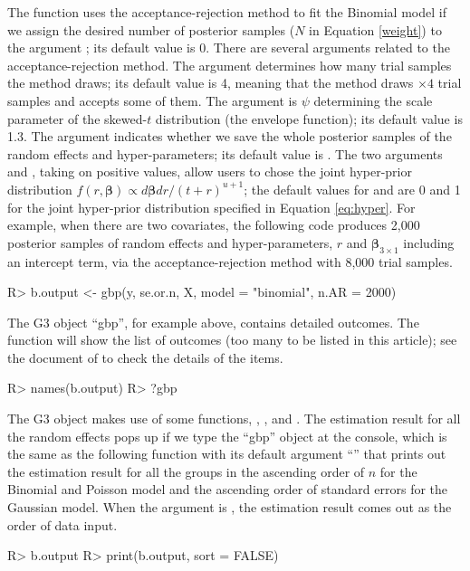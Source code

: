 \documentclass[article]{jss}
\begin{document}
The function  uses the acceptance-rejection method to fit the Binomial model if we assign the desired number of posterior samples ($N$ in Equation \ref{weight}) to the argument ; its default value is 0. There are several arguments related to the acceptance-rejection method. The argument  determines how many trial samples the method draws; its default value is 4, meaning that the method draws  $\times4$ trial samples and accepts some of them. The argument  is $\psi$ determining the scale parameter of the skewed-$t$ distribution (the envelope function); its default value is 1.3. The argument  indicates whether we save the whole posterior samples of the random effects and hyper-parameters; its default value is . The two arguments  and , taking on positive values, allow users to chose the joint hyper-prior distribution $f(r, \boldsymbol{\beta})\propto d\boldsymbol{\beta}dr/(t+r)^{u+1}$; the default values for  and  are 0 and 1 for the joint hyper-prior distribution specified in Equation \ref{eq:hyper}. For example, when there are two covariates, the following code produces 2,000 posterior samples of random effects and hyper-parameters, $r$ and $\boldsymbol{\beta}_{3\times1}$ including an intercept term, via the acceptance-rejection method with 8,000 trial samples.
\begin{CodeChunk}
\begin{CodeInput}
R> b.output <- gbp(y, se.or.n, X, model = "binomial", n.AR = 2000)
\end{CodeInput}
\end{CodeChunk}

The G3 object ``gbp'', for example  above, contains detailed outcomes. The function  will show the list of outcomes (too many to be listed in this article); see the document of  to check the details of the items.
\begin{CodeChunk}
\begin{CodeInput}
R> names(b.output)
R> ?gbp
\end{CodeInput}
\end{CodeChunk}

The G3 object makes use of some functions, , , and . The estimation result for all the random effects pops up if we type the ``gbp'' object at the  console, which is the same as the following function  with its default argument ``'' that prints out the estimation result for all the groups in the ascending order of $n$ for the Binomial and Poisson model and the ascending order of standard errors for the Gaussian model. When the argument  is , the estimation result comes out as the order of data input.
\begin{CodeChunk}
\begin{CodeInput}
R> b.output
R> print(b.output, sort = FALSE)
\end{CodeInput}
\end{CodeChunk}
\end{document}
